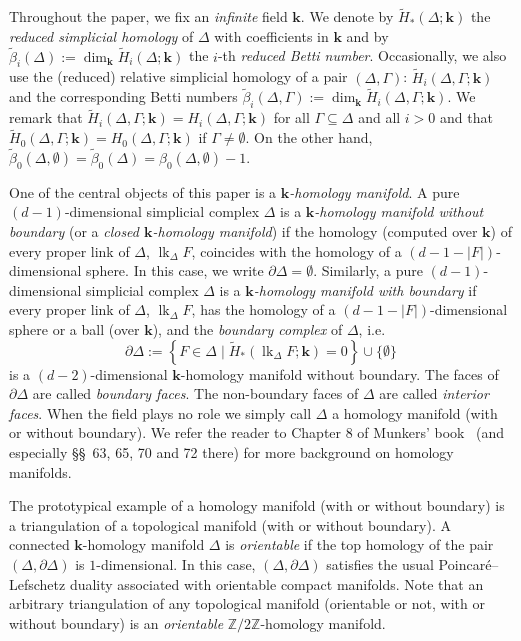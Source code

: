 \documentclass[10pt]{amsart}
\theoremstyle{definition}
\providecommand{\ie}{i.e.}
\DeclareMathOperator\lk{lk}
\newcommand{\field}{\mathbf{k}}
\newcommand{\Z}{{\mathbb Z}}
\begin{document}
Throughout the paper, we fix an \emph{infinite} field $\field$. We denote by $\tilde{H}_\ast(\Delta;\field)$ the \emph{reduced simplicial homology} of $\Delta$ with coefficients in $\field$ and by $\tilde{\beta}_i(\Delta):=\dim_\field \tilde{H}_i(\Delta;\field)$ the $i$-th \emph{reduced Betti number}. Occasionally, we also use the (reduced) relative simplicial homology of a pair $(\Delta,\Gamma)$: $\tilde{H}_i(\Delta, \Gamma;\field)$ and the corresponding Betti numbers $\tilde{\beta}_i(\Delta, \Gamma):=\dim_\field \tilde{H}_i(\Delta, \Gamma;\field)$. We remark that $\tilde{H}_i(\Delta, \Gamma;\field)=H_i(\Delta, \Gamma;\field)$ for all $\Gamma\subseteq \Delta$ and all $i>0$ and that $\tilde{H}_0(\Delta, \Gamma;\field)=H_0(\Delta, \Gamma;\field)$ if $\Gamma\neq \emptyset$. On the other hand, $\tilde{\beta}_0(\Delta,\emptyset)=\tilde{\beta}_0(\Delta)=\beta_0(\Delta,\emptyset)-1$.

One of the central objects of this paper is a \emph{$\field$-homology manifold}. A pure $(d-1)$-dimensional simplicial complex $\Delta$ is a \emph{$\field$-homology manifold without boundary} (or a \emph{closed $\field$-homology manifold}) if the homology (computed over $\field$) of every proper link of $\Delta$, $\lk_\Delta F$, coincides with the homology of a $(d-1-|F|)$-dimensional sphere. In this case, we write $\partial \Delta = \emptyset$. Similarly, a pure $(d-1)$-dimensional simplicial complex $\Delta$ is a \emph{$\field$-homology manifold with boundary} if every proper link of $\Delta$, $\lk_\Delta F$, has the homology of a $(d-1-|F|)$-dimensional sphere or a ball (over $\field$), and the \emph{boundary complex} of $\Delta$, \ie  
\[ 
\partial \Delta:= \left\{F \in \Delta \mid \tilde{H}_\ast(\lk_\Delta F; \field)=0\right\}\cup\{\emptyset\}
\]
is a $(d-2)$-dimensional $\field$-homology manifold without boundary. The faces of $\partial\Delta$ are called \emph{boundary faces}. The non-boundary faces of $\Delta$ are called \emph{interior faces}. When the field plays no role we simply call $\Delta$ a homology manifold (with or without boundary). We refer the reader to Chapter 8 of Munkers' book~\cite{Munkres-book} (and especially \S\S~63, 65, 70 and 72 there) for more background on homology manifolds.

The prototypical example of a homology manifold (with or without boundary) is a triangulation of a topological manifold (with or without boundary). A connected $\field$-homology manifold $\Delta$ is \emph{orientable} if the top homology of the pair $(\Delta, \partial \Delta)$ is $1$-dimensional. In this case, $(\Delta, \partial \Delta)$ satisfies the usual Poincar{\'e}--Lefschetz duality associated with orientable compact manifolds. Note that an arbitrary triangulation of any topological manifold (orientable or not, with or without boundary) is an \emph{orientable} $\Z/2\Z$-homology manifold.
\end{document}
